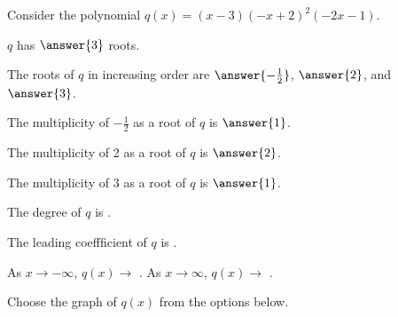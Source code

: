 \documentclass{ximera}
\author{Kenneth Berglund}
\begin{document}
Consider the polynomial $q(x) = (x - 3)(-x + 2)^2(-2x - 1)$. 

\begin{exercise}
$q$ has $\answer{3}$ roots.

\begin{exercise}
The roots of $q$ in increasing order are $\answer{-\frac{1}{2}}$, $\answer{2}$, and $\answer{3}$.

\begin{exercise}
The multiplicity of $-\frac{1}{2}$  as a root of $q$ is $\answer{1}$.

The multiplicity of 2 as a root of $q$ is $\answer{2}$. 

The multiplicity of 3 as a root of $q$ is $\answer{1}$. 

\begin{exercise}
The degree of $q$ is .

The leading coeffficient of $q$ is .

As $x \to -\infty$, $q(x) \to$ \wordChoice{\choice{$\infty$}\choice[correct]{$-\infty$}}. As $x \to \infty$, $q(x) \to$ \wordChoice{\choice{$\infty$}\choice[correct]{$-\infty$}}.

\begin{exercise}
Choose the graph of $q(x)$ from the options below.

\begin{image}
\end{image} 


\end{exercise}
\end{exercise}
\end{exercise}
\end{exercise}
\end{exercise}
\end{document}

